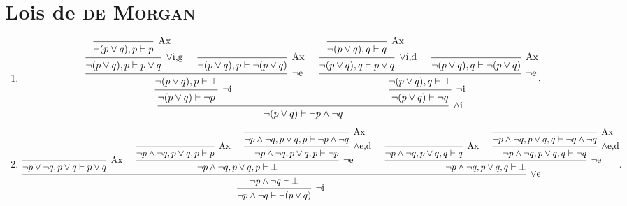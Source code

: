 \section{Lois de \textsc{de Morgan}}
\begin{enumerate}
	\item
		\[
			\begin{prooftree}
				\infer 0[Ax]{\lnot (p \lor q), p \vdash p}
				\infer 1[$\lor$i,g]{\lnot (p\lor q), p \vdash p \lor q}
				\infer 0[Ax]{\lnot (p \lor q),p \vdash \lnot (p \lor q)}
				\infer 2[$\lnot$e]{\lnot (p \lor q),p \vdash \bot} %
				\infer 1[$\lnot$i]{\lnot (p \lor q) \vdash \lnot p} %
				\infer 0[Ax]{\lnot (p \lor q), q \vdash q}
				\infer 1[$\lor$i,d]{\lnot (p \lor q), q \vdash p \lor q}
				\infer 0[Ax]{\lnot (p \lor q), q \vdash \lnot (p \lor q)}
				\infer 2[$\lnot$e]{\lnot (p \lor q), q \vdash \bot} %
				\infer 1[$\lnot$i]{\lnot (p \lor q) \vdash \lnot q} %
				\infer 2[$\land$i]{\lnot (p \lor q) \vdash \lnot p \land\lnot q}
			\end{prooftree}
		.\]
	\item
		\[
			\begin{prooftree}
				\infer 0[Ax]{\lnot p \lor \lnot q, p \lor q \vdash p \lor q}
				\infer 0[Ax]{\lnot p \land \lnot q, p \lor q, p \vdash p}
				\infer 0[Ax]{\lnot p \land \lnot q, p \lor q, p \vdash \lnot p \land \lnot q}
				\infer 1[$\land$e,d]{\lnot p \land \lnot q, p \lor q, p \vdash \lnot p} %
				\infer 2[$\lnot$e]{\lnot p \land \lnot q, p \lor q, p \vdash \bot} %
				\infer 0[Ax]{\lnot p \land \lnot q, p \lor q, q \vdash q}
				\infer 0[Ax]{\lnot p \land \lnot q, p \lor q, q \vdash \lnot q \land \lnot q}
				\infer 1[$\land$e,d]{\lnot p \land \lnot q, p \lor q, q \vdash \lnot q} %
				\infer 2[$\lnot$e]{\lnot p \land \lnot q, p \lor q, q \vdash \bot} %
				\infer 3[$\lor$e]{\lnot p \land \lnot q \vdash \bot} %
				\infer 1[$\lnot$i]{\lnot p \land \lnot q \vdash\lnot (p \lor q) } %
			\end{prooftree}
		.\]
\end{enumerate}
